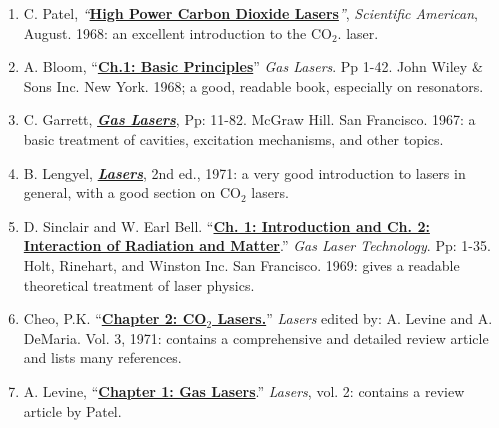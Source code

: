 \documentclass{../lab}
\begin{document}
\begin{enumerate}
    \item C. Patel, \emph{``}\href{https://drive.google.com/file/d/10IFAV9QZjHifmADlLQJbpNv70VKCtp76/view?usp=drive_link}{\textbf{High Power Carbon Dioxide Lasers}}\emph{''}, \emph{Scientific American}, August. 1968: an excellent introduction to the CO$_2$. laser.

    \item A. Bloom, ``\href{https://drive.google.com/file/d/1mvmcj36OcD2bxu_vOHEyFNUHZIql5OF_/view?usp=drive_link}{\textbf{Ch.1: Basic Principles}}'' \emph{Gas Lasers}. Pp 1-42. John Wiley \& Sons Inc. New York. 1968; a good, readable book, especially on resonators.

    \item C. Garrett, \emph{\href{https://drive.google.com/file/d/1-4oXXnX-XL7aeLO-HuXDdNGvHyhFed7e/view?usp=drive_link}{\textbf{Gas Lasers}}}, Pp: 11-82. McGraw Hill. San Francisco. 1967: a basic treatment of cavities, excitation mechanisms, and other topics.

    \item B. Lengyel, \emph{\href{https://drive.google.com/file/d/1EWECj3Uj5zJVcBwDdN_SWhw5_-0YdziW/view?usp=drive_link}{\textbf{Lasers}}}, 2nd ed., 1971: a very good introduction to lasers in general, with a good section on CO$_2$ lasers.

    \item D. Sinclair and W. Earl Bell. ``\href{https://drive.google.com/file/d/1zk4e_zh5rnMExP7eHDO0LrDfUgncye3k/view?usp=drive_link}{\textbf{Ch. 1: Introduction and Ch. 2: Interaction of Radiation and Matter}}.'' \emph{Gas Laser Technology}. Pp: 1-35. Holt, Rinehart, and Winston Inc. San Francisco. 1969: gives a readable theoretical treatment of laser physics.

    \item Cheo, P.K. ``\href{https://drive.google.com/file/d/1FBkan8fNbRIaHiI5n_FVshVOHzMt8MTF/view?usp=drive_link}{\textbf{Chapter 2: CO$_2$ Lasers.}}'' \emph{Lasers} edited by: A. Levine and A. DeMaria. Vol. 3, 1971: contains a comprehensive and detailed review article and lists many references.

    \item A. Levine, ``\href{https://drive.google.com/file/d/17UarZ5o5AM8MaxyhNA4U1gF3sTWxO-0S/view?usp=drive_link}{\textbf{Chapter 1: Gas Lasers}}.'' \emph{Lasers}, vol. 2: contains a review article by Patel.


\end{enumerate}
\end{document}
